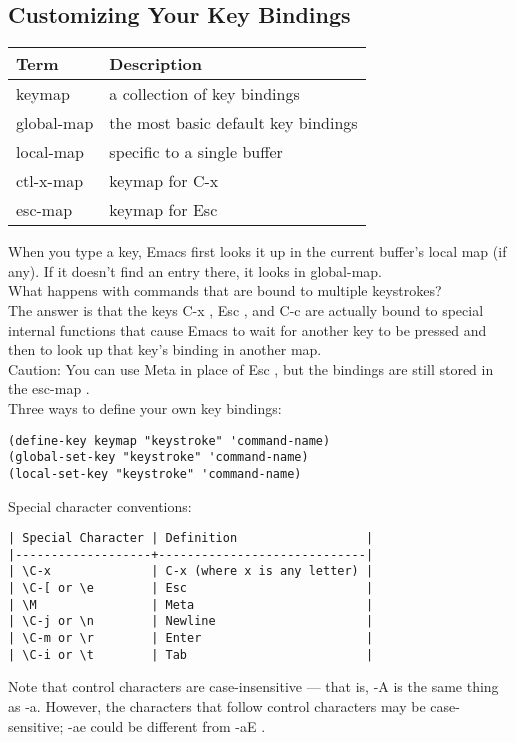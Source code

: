 \documentclass[11pt]{article}
\begin{document}
\subsection{Customizing Your Key Bindings}
\label{sec-1-3}
\begin{center}
\begin{tabular}{ll}
Term & Description\\
\hline
keymap & a collection of key bindings\\
global-map & the most basic default key bindings\\
local-map & specific to a single buffer\\
ctl-x-map & keymap for C-x\\
esc-map & keymap for Esc\\
\end{tabular}
\end{center}


When you type a key, Emacs first looks it up in the current buffer's local map (if any). If it doesn't find an entry there, it looks in global-map. \\

What happens with commands that are bound to multiple keystrokes? \\
The answer is that the keys C-x , Esc , and C-c are actually bound to special internal functions that cause Emacs to wait for another key to be pressed and then to look up that key's binding in another map. \\

Caution: You can use Meta in place of Esc , but the bindings are still stored in the esc-map . \\

Three ways to define your own key bindings: \\
\begin{verbatim}
(define-key keymap "keystroke" 'command-name)
(global-set-key "keystroke" 'command-name)
(local-set-key "keystroke" 'command-name)
\end{verbatim}


Special character conventions: \\
\begin{verbatim}
| Special Character | Definition                  |
|-------------------+-----------------------------|
| \C-x              | C-x (where x is any letter) |
| \C-[ or \e        | Esc                         |
| \M                | Meta                        |
| \C-j or \n        | Newline                     |
| \C-m or \r        | Enter                       |
| \C-i or \t        | Tab                         |
\end{verbatim}
Note that control characters are case-insensitive — that is, \C-A is the same thing as \C-a. However, the characters that follow control characters may be case-sensitive; \C-ae could be different from \C-aE . \\
\end{document}

